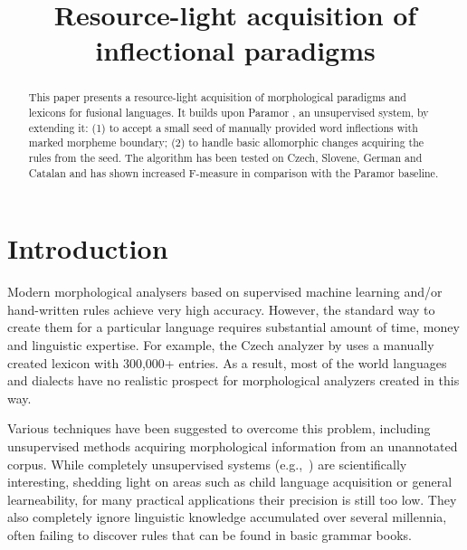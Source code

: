 \documentclass[11pt]{article}
\title{Resource-light acquisition of inflectional paradigms}
\date{}
\newcommand{\todo}[1]{[\textbf{TODO} #1]}
\newcommand{\eg}{e.g.,~}
\begin{document}
\maketitle

\begin{abstract}
This paper presents a resource-light acquisition of morphological paradigms and lexicons for fusional languages. It builds upon Paramor \cite{monson09}, an unsupervised system, by extending it:
%
(1) to accept a small seed of manually provided word inflections with marked morpheme boundary;
%
(2) to handle basic allomorphic changes acquiring the rules from the seed. %
The algorithm has been tested on Czech, Slovene, German and Catalan and has shown increased F-measure in comparison with the Paramor baseline.
\end{abstract}

\section{Introduction}


Modern morphological analysers based on supervised machine learning and/or hand-written rules achieve very high accuracy. However, the standard way to create them for a particular language requires substantial amount of time, money and linguistic expertise. For example, the Czech analyzer by \cite{hajic-2004-hab} uses a manually created lexicon with 300,000+ entries. As a result, most of the world languages and dialects have no realistic prospect for morphological analyzers created in this way.

Various techniques have been suggested to overcome this problem, including unsupervised methods acquiring morphological information from an unannotated corpus. While completely unsupervised systems (\eg \cite{goldsmith01}) are scientifically interesting, shedding light on areas such as child language acquisition or general learneability, for many practical applications their precision is still too low.  They also completely ignore linguistic knowledge accumulated over several millennia, often failing to discover rules that can be found in basic grammar books.
\end{document}
